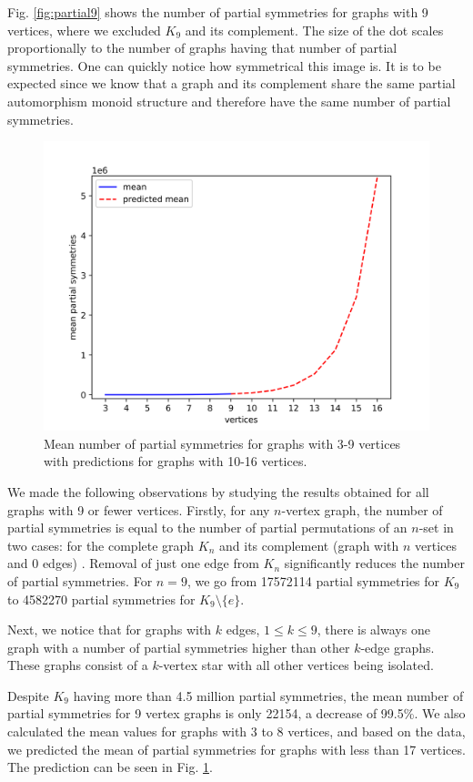 Fig. \ref{fig:partial9} shows the number of partial symmetries for graphs with 9 vertices, where we excluded $K_9$ and its complement. The size of the dot scales proportionally to the number of graphs having that number of partial symmetries. One can quickly notice how symmetrical this image is. It is to be expected since we know that a graph and its complement share the same partial automorphism monoid structure and therefore have the same number of partial symmetries.

\begin{figure}[H]
\centering
\includegraphics[scale=0.8,keepaspectratio]{images/mean_values_prediction.png}
\caption{Mean number of partial symmetries for graphs with 3-9 vertices with predictions for graphs with 10-16 vertices.}
\label{fig:prediction}
\end{figure}

We made the following observations by studying the results obtained for all graphs with 9 or fewer vertices. Firstly, for any $n$-vertex graph, the number of partial symmetries is equal to the number of partial permutations of an $n$-set in two cases: for the complete graph $K_n$ and its complement (graph with $n$ vertices and 0 edges) \cite{partialperm}. Removal of just one edge from $K_n$ significantly reduces the number of partial symmetries. For $n = 9$, we go from 17572114 partial symmetries for $K_9$ to 4582270 partial symmetries for $K_9 \setminus \{e\}$.

Next, we notice that for graphs with $k$ edges, $1 \leq k \leq 9$, there is always one graph with a number of partial symmetries higher than other $k$-edge graphs. These graphs consist of a $k$-vertex star with all other vertices being isolated.

Despite $K_9$ having more than 4.5 million partial symmetries, the mean number of partial symmetries for 9 vertex graphs is only 22154, a decrease of 99.5\%. We also calculated the mean values for graphs with 3 to 8 vertices, and based on the data, we predicted the mean of partial symmetries for graphs with less than 17 vertices. The prediction can be seen in Fig. \ref{fig:prediction}.